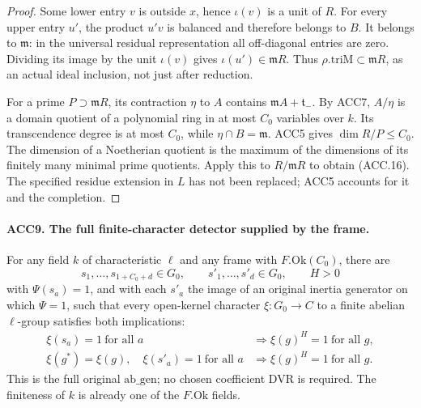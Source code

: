 \documentclass[11pt,a4paper]{article}
\numberwithin{equation}{section}
\theoremstyle{remark}\newtheorem{remark}[theorem]{Remark}
\begin{document}
\begin{proof}
Some lower entry \(v\) is outside \(x\), hence \(\iota(v)\)
is a unit of \(R\).  For every upper entry \(u'\), the product
\(u'v\) is balanced and therefore belongs to \(B\).  It belongs
to \(\mathfrak m\): in the universal residual representation
all off-diagonal entries are zero.  Dividing its image by the unit
\(\iota(v)\) gives \(\iota(u')\in\mathfrak mR\).
Thus \(\rho.\mathrm{triM}\subset\mathfrak mR\), as an actual
ideal inclusion, not just after reduction.

For a prime \(P\supset\mathfrak mR\), its contraction
\(\eta\) to \(A\) contains \(\mathfrak mA+\mathfrak t_-\).
By ACC7, \(A/\eta\) is a domain quotient of a polynomial ring
in at most \(C_0\) variables over \(k\).  Its transcendence
degree is at most \(C_0\), while \(\eta\cap B=\mathfrak m\).
ACC5 gives \(\dim R/P\le C_0\).  The dimension of a Noetherian
quotient is the maximum of the dimensions of its finitely many
minimal prime quotients.  Apply this to \(R/\mathfrak mR\)
to obtain (ACC.16).  The specified residue extension in \(L\)
has not been replaced; ACC5 accounts for it and the completion.
\end{proof}

\paragraph{ACC9. The full finite-character detector supplied by the frame.}
\label{claim:ACC9}
For any field \(k\) of characteristic \(\ell\) and any frame
with \(F.\mathrm{Ok}(C_0)\), there are
\[
 s_1,\ldots,s_{1+C_0+d}\in G_0,\qquad
 s'_1,\ldots,s'_d\in G_0,\qquad H>0                       \tag{ACC.17}
\]
with \(\Psi(s_a)=1\), and with each \(s'_a\) the image of
an original inertia generator on which \(\Psi=1\), such that
every open-kernel character \(\xi:G_0\to C\) to a finite
abelian \(\ell\)-group satisfies both implications:
\[
 \begin{split}
 \xi(s_a)=1\ \text{for all }a
       &\Longrightarrow \xi(g)^H=1\ \text{for all }g,\\
 \xi(g^*)=\xi(g),\quad \xi(s'_a)=1\ \text{for all }a
       &\Longrightarrow \xi(g)^H=1\ \text{for all }g.
 \end{split}                                                \tag{ACC.18}
\]
This is the full original \(\mathrm{ab\_\allowbreak gen}\); no chosen
coefficient DVR is required.  The finiteness of \(k\) is already
one of the \(F.\mathrm{Ok}\) fields.
\end{document}
